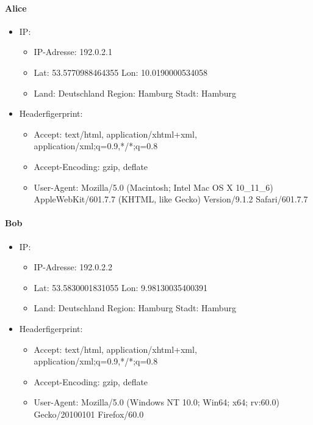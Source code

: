 \documentclass[
    fontsize=12pt,
    headings=small,
    parskip=half,           %
    bibliography=totoc,
    numbers=noenddot,       %
    open=any,               %
    ]{scrreprt}
\begin{document}
\paragraph{Alice}
\begin{itemize}
  \item IP: 
  \begin{itemize}
  \item IP-Adresse: 192.0.2.1
  \item \ac{Lat}: 53.5770988464355 \ac{Lon}: 10.0190000534058
  \item Land: Deutschland Region: Hamburg Stadt: Hamburg
  \end{itemize}
  \item Headerfigerprint:  
  \begin{itemize}
  \item Accept: text/html, application/xhtml+xml, application/xml;q=0.9,*/*;q=0.8
  \item Accept-Encoding: gzip, deflate
  \item User-Agent: Mozilla/5.0 (Macintosh; Intel Mac OS X 10\_11\_6) AppleWebKit/601.7.7 (KHTML, like Gecko) Version/9.1.2 Safari/601.7.7
  \end{itemize}
\end{itemize}

\paragraph{Bob}
\begin{itemize}
  \item IP: 
  \begin{itemize}
  \item IP-Adresse: 192.0.2.2
  \item \ac{Lat}: 53.5830001831055 \ac{Lon}: 9.98130035400391
  \item Land: Deutschland Region: Hamburg Stadt: Hamburg
  \end{itemize}
  \item Headerfigerprint:  
  \begin{itemize}
  \item Accept: text/html, application/xhtml+xml, application/xml;q=0.9,*/*;q=0.8
  \item Accept-Encoding: gzip, deflate
  \item User-Agent: Mozilla/5.0 (Windows NT 10.0; Win64; x64; rv:60.0) Gecko/20100101 Firefox/60.0
  \end{itemize}
\end{itemize}
\end{document}
